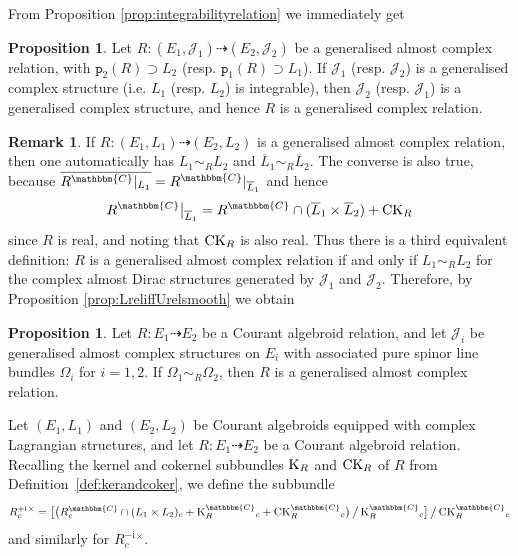 \documentclass[a4paper, reqno, 11pt]{amsart}
\numberwithin{equation}{section}
\theoremstyle{definition}
\newtheorem{proposition}[equation]{Proposition}
\newtheorem{remark}[equation]{Remark}
\newcommand{\ii}{\mathrm{i}}
\newcommand{\rmp}{\mathtt{p}}
\newcommand{\IC}{\mathbbm{C}}
\newcommand{\cJ}{{\mathcal J}}
\newcommand{\rel}{\dashrightarrow}
\theoremstyle{remark}
\begin{document}
From Proposition \ref{prop:integrabilityrelation} we immediately get

\begin{proposition}
    Let $R\colon(E_1, \cJ_1) \rel (E_2, \cJ_2)$ be a generalised almost complex relation, with $\rmp_2(R)\supset L_2$ (resp. $\rmp_1(R)\supset L_1$). If $\cJ_1$ (resp. $\cJ_2$) is a generalised complex structure (i.e. $L_1$ (resp. $L_2$) is integrable), then $\cJ_2$ (resp. $\cJ_1$) is a generalised complex structure, and hence $R$ is a generalised complex relation.
\end{proposition}

\begin{remark}\label{rem:3rddefinition}
    If $R \colon (E_1, L_1) \rel (E_2, L_2)$ is a generalised almost complex relation, then one automatically has $L_1 \sim_R L_2$ and $\overline{L}_1 \sim_R \overline L_2$. The converse is also true, because $\overline{R^\IC\rvert_{L_1}} = R^\IC\rvert_{\overline L_1}$ and hence
    \begin{align}
        R^\IC\big\rvert_{\overline L_1} = R^\IC\cap (\overline L_1 \times \overline{L}_2) + {\rm CK}_R
    \end{align}
    since $R$ is real, and noting that ${\rm CK}_R$ is also real. Thus there is a third equivalent definition: $R$ is a generalised almost complex relation if and only if $L_1 \sim_R L_2$ for the complex almost Dirac structures generated by $\cJ_1$ and $\cJ_2$. Therefore, by Proposition \ref{prop:LreliffUrelsmooth} we obtain
\end{remark}

\begin{proposition}\label{prop:UreliffJrel}
    Let $R\colon E_1 \rel E_2$ be a Courant algebroid relation, and let $\cJ_i$ be  generalised almost complex structures on $E_i$ with associated pure spinor line bundles $\Omega_i$ for $i=1,2$. If  $\Omega_1\sim_{R} \Omega_2$, then $R$ is a generalised almost complex relation.
\end{proposition}

Let $(E_1, L_1)$ and $ (E_2, L_2)$ be Courant algebroids equipped with complex Lagrangian structures, and let $R \colon E_1 \rel E_2$ be  a Courant algebroid relation. Recalling the kernel and cokernel subbundles ${\rm K}_R$ and ${\rm CK}_R$ of $R$ from Definition~\ref{def:kerandcoker}, we define the subbundle
\begin{align}
    R^{+\ii}_c{}^\times = \big[\big(R^\IC_c\cap (L_1 \times L_2)_c + {\rm K}^\IC_{R}{}_c + {\rm CK}^\IC_{R}{}_c\big)\,\big/\,{\rm K}^\IC_{R}{}_c\big]\,\big/\,{\rm CK}^\IC_{R}{}_c
\end{align}
and similarly for $R^{-\ii}_c{}^\times$.
\end{document}
